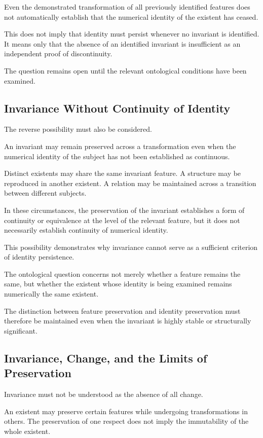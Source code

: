 Even the demonstrated transformation of all previously
identified features does not automatically establish
that the numerical identity of the existent has ceased.

This does not imply that identity must persist whenever
no invariant is identified. It means only that the
absence of an identified invariant is insufficient
as an independent proof of discontinuity.

The question remains open until the relevant ontological
conditions have been examined.

\subsection{Invariance Without Continuity of Identity}

The reverse possibility must also be considered.

An invariant may remain preserved across a transformation
even when the numerical identity of the subject
has not been established as continuous.

Distinct existents may share the same invariant feature.
A structure may be reproduced in another existent.
A relation may be maintained across a transition
between different subjects.

In these circumstances, the preservation of the
invariant establishes a form of continuity or
equivalence at the level of the relevant feature,
but it does not necessarily establish continuity
of numerical identity.

This possibility demonstrates why invariance cannot
serve as a sufficient criterion of identity persistence.

The ontological question concerns not merely whether
a feature remains the same, but whether the existent
whose identity is being examined remains numerically
the same existent.

The distinction between feature preservation and
identity preservation must therefore be maintained
even when the invariant is highly stable or structurally
significant.

\subsection{Invariance, Change, and the Limits of Preservation}

Invariance must not be understood as the absence
of all change.

An existent may preserve certain features while
undergoing transformations in others. The preservation
of one respect does not imply the immutability of
the whole existent.

